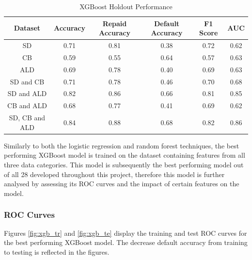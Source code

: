 \begin{table}[H]
\begin{center}
\begin{tabular}{|c|c|c|c|c|c|} 
\hline
\multicolumn{1}{|c|}{Dataset}
&\multicolumn{1}{|c|}{Accuracy}
&\multicolumn{1}{|c|}{Repaid Accuracy}
&\multicolumn{1}{|c|}{Default Accuracy}
&\multicolumn{1}{|c|}{F1 Score}
&\multicolumn{1}{|c|}{AUC}\\
\hline
SD & 0.71 & 0.81 & 0.38 & 0.72 & 0.62    \\
\hline
CB & 0.59 & 0.55 & 0.64 & 0.57 & 0.63    \\
\hline
ALD & 0.69 & 0.78 & 0.40 & 0.69 & 0.63    \\
\hline
SD and CB & 0.71 & 0.78 & 0.46 & 0.70 & 0.68    \\
\hline
SD and ALD & 0.82 & 0.86 & 0.66 & 0.81 & 0.85    \\
\hline
CB and ALD & 0.68 & 0.77 & 0.41 & 0.69 & 0.62    \\
\hline
SD, CB and ALD & 0.84 & 0.88 & 0.68 & 0.82 & 0.86    \\
\hline
\end{tabular}
\end{center}
\caption{XGBoost Holdout Performance}
\label{table:xgb test}
\end{table}

\vspace{10pt}

Similarly to both the logistic regression and random forest techniques, the best performing XGBoost model is trained on the dataset containing features from all three data categories. This model is subsequently the best performing model out of all 28 developed throughout this project, therefore this model is further analysed by assessing its ROC curves and the impact of certain features on the model. 


\subsubsection{ROC Curves}


Figures \ref{fig:xgb_tr} and \ref{fig:xgb_te} display the training and test ROC curves for the best performing XGBoost model. The decrease  default accuracy from training to testing is reflected in the figures.

\vspace{10 pt}

